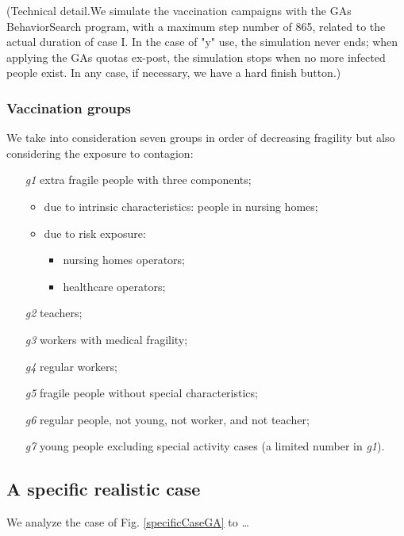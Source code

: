 \documentclass[graybox]{svmult}
\begin{document}
(Technical detail.We simulate the vaccination campaigns with the GAs BehaviorSearch program, with a maximum step number of 865, related to the actual duration of case I. In the case of "y" use, the simulation never ends; when applying the GAs quotas ex-post, the simulation stops when no more infected people exist. In any case, if necessary, we have a hard finish button.)

\subsubsection{Vaccination groups}
\label{vgroups}

We take into consideration seven groups in order of decreasing fragility but also considering the exposure to contagion:

\begin{enumerate}
\item [\emph{g1}]
	extra fragile people with three components;
	\begin{itemize}
		\item due to intrinsic characteristics: people in nursing homes;
		\item due to risk exposure:
		\begin{itemize}
			\item nursing homes operators;
			\item healthcare operators;
 		\end{itemize} 
 	\end{itemize} 
\item [\emph{g2}]
	teachers;
\item [\emph{g3}]
	workers with medical fragility;
\item [\emph{g4}]
	regular workers;
\item [\emph{g5}]
	fragile people without special characteristics;
\item [\emph{g6}]
	regular people, not young, not worker, and not teacher;
\item [\emph{g7}]
	young people excluding special activity cases (a limited number in \emph{g1}).
\end{enumerate}


\subsection{A specific realistic case}
\label{specific}

We analyze the case of Fig. \ref{specificCaseGA} to \ldots
\end{document}
